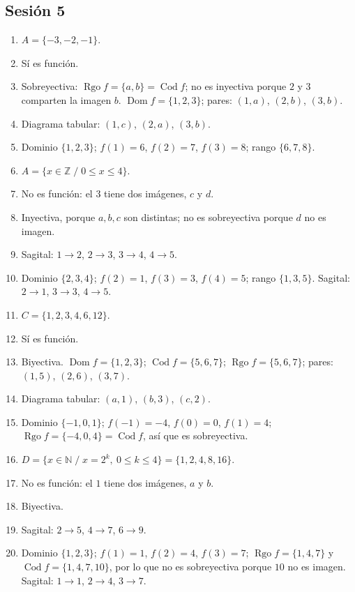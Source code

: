 \documentclass[12pt, letterpaper]{article}
\newcommand{\N}{\mathbb{N}}
\newcommand{\Z}{\mathbb{Z}}
\begin{document}
\subsection*{Sesión 5}
\begin{enumerate}[leftmargin=*, label=\textbf{\arabic*.}]
  \item $A=\{-3,-2,-1\}$.
  \item Sí es función.
  \item Sobreyectiva: $\operatorname{Rgo} f=\{a,b\}=\operatorname{Cod} f$; no es inyectiva porque $2$ y $3$ comparten la imagen $b$. $\operatorname{Dom} f=\{1,2,3\}$; pares: $(1,a)$, $(2,b)$, $(3,b)$.
  \item Diagrama tabular: $(1,c)$, $(2,a)$, $(3,b)$.
  \item Dominio $\{1,2,3\}$; $f(1)=6$, $f(2)=7$, $f(3)=8$; rango $\{6,7,8\}$.
  \item $A=\{x\in\Z \;/\; 0\le x\le 4\}$.
  \item No es función: el $3$ tiene dos imágenes, $c$ y $d$.
  \item Inyectiva, porque $a,b,c$ son distintas; no es sobreyectiva porque $d$ no es imagen.
  \item Sagital: $1\to2$, $2\to3$, $3\to4$, $4\to5$.
  \item Dominio $\{2,3,4\}$; $f(2)=1$, $f(3)=3$, $f(4)=5$; rango $\{1,3,5\}$. Sagital: $2\to1$, $3\to3$, $4\to5$.
  \item $C=\{1,2,3,4,6,12\}$.
  \item Sí es función.
  \item Biyectiva. $\operatorname{Dom} f=\{1,2,3\}$; $\operatorname{Cod} f=\{5,6,7\}$; $\operatorname{Rgo} f=\{5,6,7\}$; pares: $(1,5)$, $(2,6)$, $(3,7)$.
  \item Diagrama tabular: $(a,1)$, $(b,3)$, $(c,2)$.
  \item Dominio $\{-1,0,1\}$; $f(-1)=-4$, $f(0)=0$, $f(1)=4$; $\operatorname{Rgo} f=\{-4,0,4\}=\operatorname{Cod} f$, así que es sobreyectiva.
  \item $D=\{x\in\N \;/\; x=2^k,\ 0\le k\le 4\}=\{1,2,4,8,16\}$.
  \item No es función: el $1$ tiene dos imágenes, $a$ y $b$.
  \item Biyectiva.
  \item Sagital: $2\to5$, $4\to7$, $6\to9$.
  \item Dominio $\{1,2,3\}$; $f(1)=1$, $f(2)=4$, $f(3)=7$; $\operatorname{Rgo} f=\{1,4,7\}$ y $\operatorname{Cod} f=\{1,4,7,10\}$, por lo que no es sobreyectiva porque $10$ no es imagen. Sagital: $1\to1$, $2\to4$, $3\to7$.
\end{enumerate}
\end{document}
